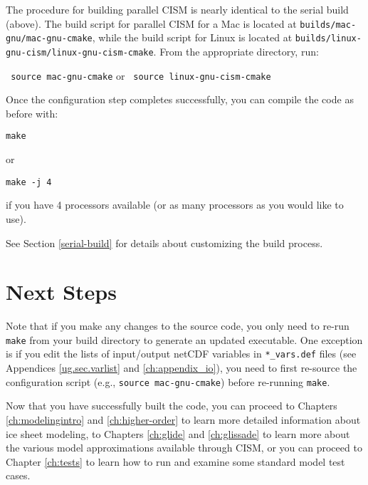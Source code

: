 The procedure for building parallel CISM is nearly identical to the serial build (above).
The build script for parallel CISM for a Mac is located at \texttt{builds/mac-gnu/mac-gnu-cmake}, 
while the build script for Linux is located at \texttt{builds/linux-gnu-cism/linux-gnu-cism-cmake}.
From the appropriate directory, run:

\texttt{ source mac-gnu-cmake} or \texttt{ source linux-gnu-cism-cmake}

Once the configuration step completes successfully, you can compile the code as before with:

\texttt{make}

or

\texttt{make -j 4}

if you have 4 processors available (or as many processors as you would like to use).

See Section \ref{serial-build} for details about customizing the build process.


\section{Next Steps}
Note that if you make any changes to the source code, you only need to re-run
\texttt{make} from your build directory to generate an updated executable.  
One exception is if you edit the lists of input/output netCDF variables in 
\texttt{*\_vars.def} files (see Appendices \ref{ug.sec.varlist} and \ref{ch:appendix_io}), 
you need to first re-source the configuration script 
(e.g., \texttt{source mac-gnu-cmake}) before re-running \texttt{make}.


Now that you have successfully built the code, you can proceed to Chapters \ref{ch:modelingintro} and \ref{ch:higher-order} to learn more detailed 
information about ice sheet modeling, to Chapters \ref{ch:glide} and \ref{ch:glissade} to learn more about the various model approximations 
available through CISM, or you can proceed to Chapter \ref{ch:tests} to learn how to run and examine some standard model test cases.  


